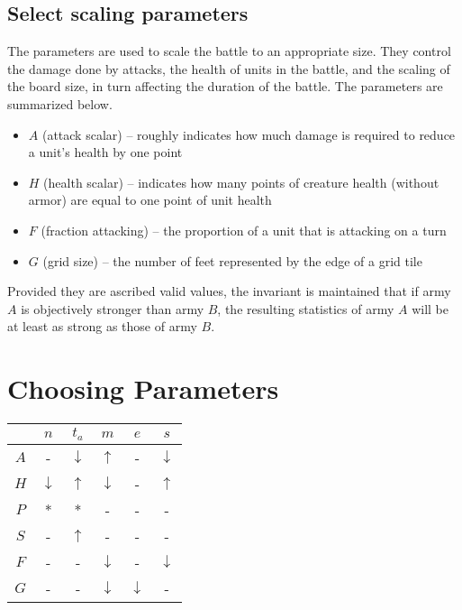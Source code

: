 \subsection{Select scaling parameters}


The parameters are used to scale the battle to an appropriate size.
They control the damage done by attacks,
the health of units in the battle,
and the scaling of the board size,
in turn affecting the duration of the battle.
The parameters are summarized below.

\begin{itemize}
    \item $A$ (attack scalar) -- roughly indicates how much damage is required to reduce a unit's health by one point
    \item $H$ (health scalar) -- indicates how many points of creature health (without armor) are equal to one point of unit health
    \item $F$ (fraction attacking) -- the proportion of a unit that is attacking on a turn
    \item $G$ (grid size) -- the number of feet represented by the edge of a grid tile
\end{itemize}

Provided they are ascribed valid values,
the invariant is maintained that if army $A$ is objectively stronger than army $B$,
the resulting statistics of army $A$ will be at least as strong as those of army $B$.

\section{Choosing Parameters}\label{sec:params}

\begin{table}
\begin{tabular}{c|c|c|c|c|c}
        &   $n$             &   $t_a$           &   $m$             &   $e$             &   $s$             \\
    \hline
    $A$ &   -               &   $\downarrow$    &   $\uparrow$      &   -               &   $\downarrow$    \\
    $H$ &   $\downarrow$    &   $\uparrow$      &   $\downarrow$    &   -               &   $\uparrow$      \\
    $P$ &   *               &   *               &   -               &   -               &   -               \\
    $S$ &   -               &   $\uparrow$      &   -               &   -               &   -               \\
    $F$ &   -               &   -               &   $\downarrow$    &   -               &   $\downarrow$    \\
    $G$ &   -               &   -               &   $\downarrow$    &   $\downarrow$    &   -
\end{tabular}
\end{table}

